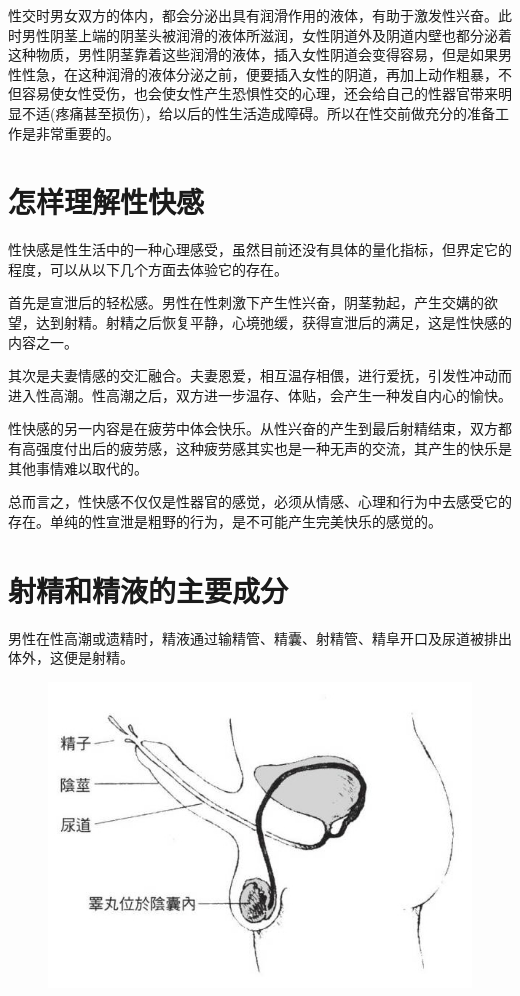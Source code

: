 \documentclass[12pt,UTF8]{ctexbook}
\begin{document}
性交时男女双方的体内，都会分泌出具有润滑作用的液体，有助于激发性兴奋。此时男性阴茎上端的阴茎头被润滑的液体所滋润，女性阴道外及阴道内壁也都分泌着这种物质，男性阴茎靠着这些润滑的液体，插入女性阴道会变得容易，但是如果男性性急，在这种润滑的液体分泌之前，便要插入女性的阴道，再加上动作粗暴，不但容易使女性受伤，也会使女性产生恐惧性交的心理，还会给自己的性器官带来明显不适(疼痛甚至损伤)，给以后的性生活造成障碍。所以在性交前做充分的准备工作是非常重要的。

\section{怎样理解性快感}

性快感是性生活中的一种心理感受，虽然目前还没有具体的量化指标，但界定它的程度，可以从以下几个方面去体验它的存在。

首先是宣泄后的轻松感。男性在性刺激下产生性兴奋，阴茎勃起，产生交媾的欲望，达到射精。射精之后恢复平静，心境弛缓，获得宣泄后的满足，这是性快感的内容之一。

其次是夫妻情感的交汇融合。夫妻恩爱，相互温存相偎，进行爱抚，引发性冲动而进入性高潮。性高潮之后，双方进一步温存、体贴，会产生一种发自内心的愉快。

性快感的另一内容是在疲劳中体会快乐。从性兴奋的产生到最后射精结束，双方都有高强度付出后的疲劳感，这种疲劳感其实也是一种无声的交流，其产生的快乐是其他事情难以取代的。

总而言之，性快感不仅仅是性器官的感觉，必须从情感、心理和行为中去感受它的存在。单纯的性宣泄是粗野的行为，是不可能产生完美快乐的感觉的。

\section{射精和精液的主要成分}

男性在性高潮或遗精时，精液通过输精管、精囊、射精管、精阜开口及尿道被排出体外，这便是射精。

\begin{figure}[htbp]
	\centering
	\includegraphics[width=0.7\linewidth]{5}
	\caption{}
\end{figure}
\end{document}
